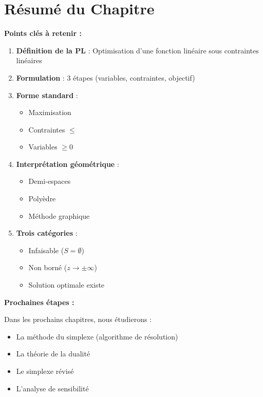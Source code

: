 \documentclass[12pt,a4paper]{article}
\begin{document}
\newpage
\section{Résumé du Chapitre}

\begin{important}
\textbf{Points clés à retenir :}

\begin{enumerate}
    \item \textcolor{titrebleu}{\textbf{Définition de la PL}} : Optimisation d'une fonction linéaire sous contraintes linéaires
    
    \item \textcolor{defvert}{\textbf{Formulation}} : 3 étapes (variables, contraintes, objectif)
    
    \item \textcolor{algoviolet}{\textbf{Forme standard}} : 
    \begin{itemize}
        \item Maximisation
        \item Contraintes $\leq$
        \item Variables $\geq 0$
    \end{itemize}
    
    \item \textcolor{exempleorange}{\textbf{Interprétation géométrique}} :
    \begin{itemize}
        \item Demi-espaces
        \item Polyèdre
        \item Méthode graphique
    \end{itemize}
    
    \item \textcolor{importantrouge}{\textbf{Trois catégories}} :
    \begin{itemize}
        \item Infaisable ($S = \emptyset$)
        \item Non borné ($z \to \pm\infty$)
        \item Solution optimale existe
    \end{itemize}
\end{enumerate}
\end{important}

\begin{astuce}
\textbf{Prochaines étapes :}

Dans les prochains chapitres, nous étudierons :
\begin{itemize}
    \item La méthode du simplexe (algorithme de résolution)
    \item La théorie de la dualité
    \item Le simplexe révisé
    \item L'analyse de sensibilité
\end{itemize}
\end{astuce}
\end{document}
